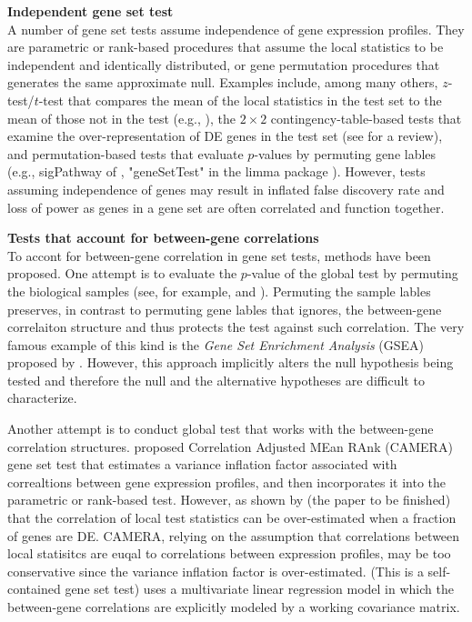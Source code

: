 \documentclass[11pt, a4paper]{article}
\begin{document}
	\textbf{Independent gene set test} \\
	 A number of gene set tests assume independence of gene expression profiles. They are parametric or rank-based procedures that assume the local statistics to be independent and identically distributed, or gene permutation procedures that generates the same approximate null. Examples include, among many others, $z$-test/$t$-test that compares the mean of the local statistics in the test set to the mean of those not in the test (e.g., \citealp{kim2005page}), the $2\times 2$ contingency-table-based tests that examine the over-representation of DE genes in the test set (see \citealp{huang2009bioinformatics} for a review), and permutation-based tests that evaluate $p$-values by permuting gene lables (e.g., sigPathway of \citealp{tian2005discovering}, "geneSetTest" in the limma package \citealp{Smyth2004moderated}). However, tests assuming independence of genes may result in inflated false discovery rate \citep{efron2007testing} and loss of power %
	 as genes in a gene set are often correlated and function together.
	 
	  \textbf{Tests that account for between-gene correlations}\\
	  To accont for between-gene correlation in gene set tests, methods have been proposed. One attempt is to evaluate the $p$-value of the global test by permuting the biological samples (see, for example, \citealp{subramanian2005gene} and \citealp{efron2007testing}). Permuting the sample lables preserves, in contrast to permuting gene lables that ignores, the between-gene correlaiton structure and thus protects the test against such correlation. The very famous example of this kind is the \textit{Gene Set Enrichment Analysis }(GSEA) proposed by \cite{subramanian2005gene}.  However, this approach implicitly alters the null hypothesis being tested and therefore the null and the alternative hypotheses are difficult to characterize. 
	  
	   Another attempt is to conduct global test that works with the between-gene correlation structures. \cite{wu2012camera} proposed Correlation Adjusted MEan RAnk (CAMERA) gene set test that estimates a variance inflation factor associated with correaltions between gene expression profiles, and then incorporates it into the parametric or rank-based test. However, as shown by (the paper to be finished) that the correlation of local test statistics can be over-estimated when a fraction of genes are DE. CAMERA, relying on the assumption that correlations between local statisitcs are euqal to correlations between expression profiles, may be too conservative since the variance inflation factor is over-estimated. (This is a self-contained gene set test) \cite{huang2013gene} uses a multivariate linear regression model in which the between-gene correlations are explicitly modeled by a working covariance matrix.
\end{document}
